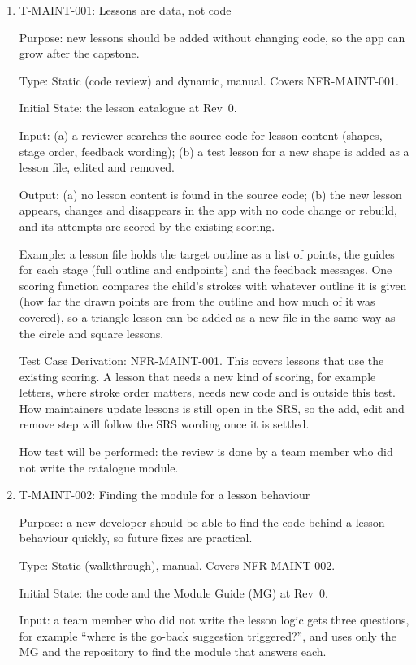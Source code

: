 \documentclass[12pt, titlepage]{article}
\newcommand{\testitem}[1]{\item #1\par\nopagebreak}
\begin{document}
\begin{enumerate}

\testitem{T-MAINT-001: Lessons are data, not code}

Purpose: new lessons should be added without changing code, so the app can
grow after the capstone.

Type: Static (code review) and dynamic, manual. Covers NFR-MAINT-001.

Initial State: the lesson catalogue at Rev~0.

Input: (a) a reviewer searches the source code for lesson content (shapes,
stage order, feedback wording); (b) a test lesson for a new shape is added
as a lesson file, edited and removed.

Output: (a) no lesson content is found in the source code; (b) the new
lesson appears, changes and disappears in the app with no code change or
rebuild, and its attempts are scored by the existing scoring.

Example: a lesson file holds the target outline as a list of points, the
guides for each stage (full outline and endpoints) and the feedback
messages. One scoring function compares the child's strokes with whatever
outline it is given (how far the drawn points are from the outline and how
much of it was covered), so a triangle lesson can be added as a new file in
the same way as the circle and square lessons.

Test Case Derivation: NFR-MAINT-001. This covers lessons that use the
existing scoring. A lesson that needs a new kind of scoring, for example
letters, where stroke order matters, needs new code and is outside this
test. How maintainers update lessons is still open in the SRS, so the
add, edit and remove step will follow the SRS wording once it is settled.

How test will be performed: the review is done by a team member who did
not write the catalogue module.

\testitem{T-MAINT-002: Finding the module for a lesson behaviour}

Purpose: a new developer should be able to find the code behind a lesson
behaviour quickly, so future fixes are practical.

Type: Static (walkthrough), manual. Covers NFR-MAINT-002.

Initial State: the code and the Module Guide (MG) at Rev~0.

Input: a team member who did not write the lesson logic gets three
questions, for example ``where is the go-back suggestion triggered?'', and
uses only the MG and the repository to find the module that answers each.


\end{enumerate}
\end{document}

